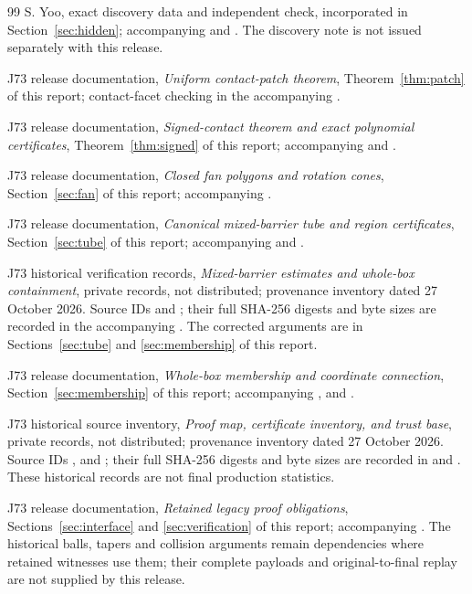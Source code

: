 \begin{thebibliography}{99}
 S. Yoo, exact discovery data and independent check,
incorporated in Section~\ref{sec:hidden}; accompanying
 and .
The discovery note is not issued separately with this release.

 J73 release documentation,
\emph{Uniform contact-patch theorem}, Theorem~\ref{thm:patch}
of this report; contact-facet checking in the accompanying
.

 J73 release documentation,
\emph{Signed-contact theorem and exact polynomial certificates},
Theorem~\ref{thm:signed} of this report; accompanying
 and .

 J73 release documentation,
\emph{Closed fan polygons and rotation cones},
Section~\ref{sec:fan} of this report; accompanying
.

 J73 release documentation,
\emph{Canonical mixed-barrier tube and region certificates},
Section~\ref{sec:tube} of this report; accompanying
 and
.

 J73 historical verification records,
\emph{Mixed-barrier estimates and whole-box containment},
private records, not distributed; provenance inventory dated
27 October 2026. Source IDs  and
; their full SHA-256 digests and byte sizes
are recorded in the accompanying .
The corrected arguments are in Sections~\ref{sec:tube}
and \ref{sec:membership} of this report.

 J73 release documentation,
\emph{Whole-box membership and coordinate connection},
Section~\ref{sec:membership} of this report; accompanying
, 
and .

 J73 historical source inventory,
\emph{Proof map, certificate inventory, and trust base},
private records, not distributed; provenance inventory dated
27 October 2026. Source IDs ,
 and ;
their full SHA-256 digests and byte sizes are recorded in
 and .
These historical records are not final production statistics.

 J73 release documentation,
\emph{Retained legacy proof obligations},
Sections~\ref{sec:interface} and \ref{sec:verification} of this report;
accompanying .
The historical balls, tapers and collision arguments remain dependencies
where retained witnesses use them; their complete payloads and
original-to-final replay are not supplied by this release.


\end{thebibliography}
